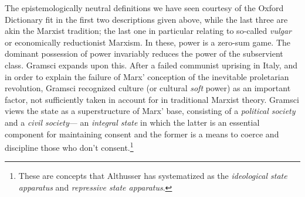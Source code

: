 \documentclass[10pt,british,A4paper,oneside]{memoir}
\begin{document}
The epistemologically neutral definitions we have seen courtesy of the
Oxford Dictionary fit in the first two descriptions given above, while
the last three are akin the Marxist tradition; the last one in
particular relating to so-called \emph{vulgar} or economically
reductionist Marxism. In these, power is a zero-sum game. The dominant
possession of power invariably reduces the power of the subservient
class. Gramsci expands upon this. After a failed communist uprising in
Italy, and in order to explain the failure of Marx' conception of the
inevitable proletarian revolution, Gramsci recognized culture (or
cultural \emph{soft} power) as an important factor, not sufficiently
taken in account for in traditional Marxist theory. Gramsci views the
state as a superstructure of Marx' base, consisting of a \emph{political
society} and a \emph{civil society}--- an \emph{integral state} in which
the latter is an essential component for maintaining consent and the
former is a means to coerce and discipline those who don't
consent.\footnote{These are concepts that Althusser has systematized as
  the \emph{ideological state apparatus} and \emph{repressive state
  apparatus}.}
\end{document}
